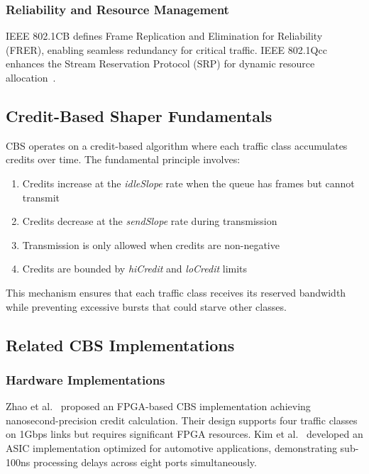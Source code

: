 \documentclass[10pt, journal, compsoc]{IEEEtran}
\begin{document}
\subsubsection{Reliability and Resource Management}
IEEE 802.1CB defines Frame Replication and Elimination for Reliability (FRER), enabling seamless redundancy for critical traffic. IEEE 802.1Qcc enhances the Stream Reservation Protocol (SRP) for dynamic resource allocation~\cite{ieee8021cb}.

\subsection{Credit-Based Shaper Fundamentals}

CBS operates on a credit-based algorithm where each traffic class accumulates credits over time. The fundamental principle involves:

\begin{enumerate}
    \item Credits increase at the \textit{idleSlope} rate when the queue has frames but cannot transmit
    \item Credits decrease at the \textit{sendSlope} rate during transmission
    \item Transmission is only allowed when credits are non-negative
    \item Credits are bounded by \textit{hiCredit} and \textit{loCredit} limits
\end{enumerate}

This mechanism ensures that each traffic class receives its reserved bandwidth while preventing excessive bursts that could starve other classes.

\subsection{Related CBS Implementations}

\subsubsection{Hardware Implementations}

Zhao et al.~\cite{zhao2020timing} proposed an FPGA-based CBS implementation achieving nanosecond-precision credit calculation. Their design supports four traffic classes on 1Gbps links but requires significant FPGA resources. Kim et al.~\cite{kim2021hardware} developed an ASIC implementation optimized for automotive applications, demonstrating sub-100ns processing delays across eight ports simultaneously.
\end{document}
